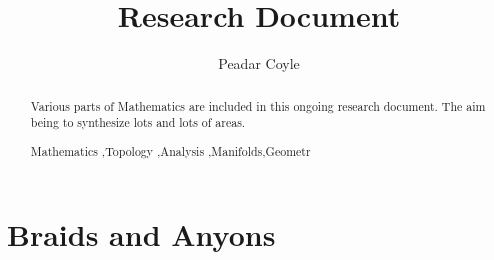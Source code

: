 \documentclass[preprint, 5p, 10pt]{elsarticle}
\theoremstyle{plain}
\begin{document}
\begin{frontmatter}
 \title{Research Document}
\author{Peadar Coyle}
\address{ 18 Cottage Road \\
Newry \\
County Down}
 
\maketitle
\begin{abstract}

Various parts of Mathematics are included in this ongoing research document. 
The aim being to synthesize lots and lots of areas.


\begin{keyword}
Mathematics \sep Topology \sep Analysis \sep Manifolds\sep Geometr
\end{keyword}


\end{abstract}


\tableofcontents
\end{frontmatter}
\section{Braids and Anyons}
\end{document}
